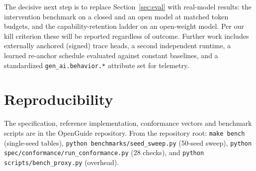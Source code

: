 \documentclass[11pt]{article}
\newcommand{\sys}{OpenGuide}
\newcommand{\code}[1]{\texttt{#1}}
\begin{document}
The decisive next step is to replace Section~\ref{sec:eval} with real-model
results: the intervention benchmark on a closed and an open model at matched token
budgets, and the capability-retention ladder on an open-weight model. Per our
kill criterion these will be reported regardless of outcome. Further work includes
externally anchored (signed) trace heads, a second independent runtime, a
learned re-anchor schedule evaluated against constant baselines, and a
standardized \code{gen\_ai.behavior.*} attribute set for telemetry.

\section*{Reproducibility}
The specification, reference implementation, conformance vectors and benchmark
scripts are in the \sys{} repository. From the repository root:
\code{make bench} (single-seed tables), \code{python benchmarks/seed\_sweep.py}
(50-seed sweep), \code{python spec/conformance/run\_conformance.py}
(28 checks), and \code{python scripts/bench\_proxy.py} (overhead).



\end{document}

